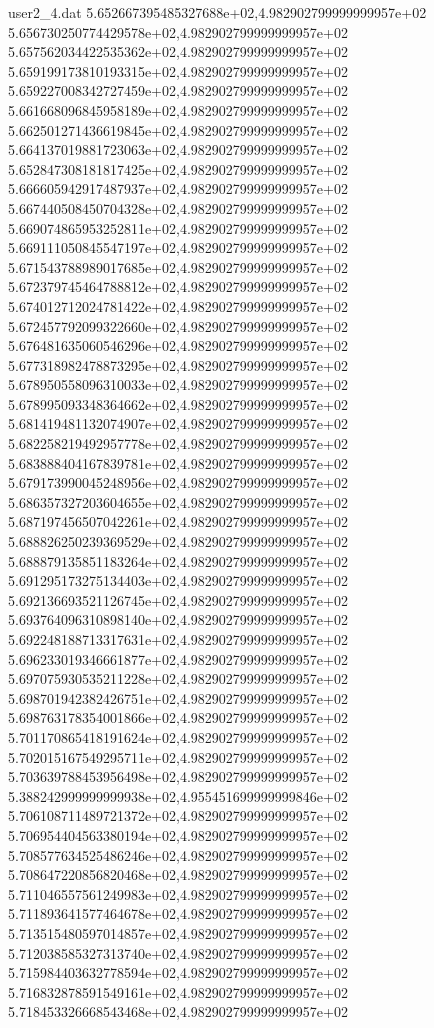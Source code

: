 \begin{filecontents}{user2_4.dat}
5.652667395485327688e+02,4.982902799999999957e+02
5.656730250774429578e+02,4.982902799999999957e+02
5.657562034422535362e+02,4.982902799999999957e+02
5.659199173810193315e+02,4.982902799999999957e+02
5.659227008342727459e+02,4.982902799999999957e+02
5.661668096845958189e+02,4.982902799999999957e+02
5.662501271436619845e+02,4.982902799999999957e+02
5.664137019881723063e+02,4.982902799999999957e+02
5.652847308181817425e+02,4.982902799999999957e+02
5.666605942917487937e+02,4.982902799999999957e+02
5.667440508450704328e+02,4.982902799999999957e+02
5.669074865953252811e+02,4.982902799999999957e+02
5.669111050845547197e+02,4.982902799999999957e+02
5.671543788989017685e+02,4.982902799999999957e+02
5.672379745464788812e+02,4.982902799999999957e+02
5.674012712024781422e+02,4.982902799999999957e+02
5.672457792099322660e+02,4.982902799999999957e+02
5.676481635060546296e+02,4.982902799999999957e+02
5.677318982478873295e+02,4.982902799999999957e+02
5.678950558096310033e+02,4.982902799999999957e+02
5.678995093348364662e+02,4.982902799999999957e+02
5.681419481132074907e+02,4.982902799999999957e+02
5.682258219492957778e+02,4.982902799999999957e+02
5.683888404167839781e+02,4.982902799999999957e+02
5.679173990045248956e+02,4.982902799999999957e+02
5.686357327203604655e+02,4.982902799999999957e+02
5.687197456507042261e+02,4.982902799999999957e+02
5.688826250239369529e+02,4.982902799999999957e+02
5.688879135851183264e+02,4.982902799999999957e+02
5.691295173275134403e+02,4.982902799999999957e+02
5.692136693521126745e+02,4.982902799999999957e+02
5.693764096310898140e+02,4.982902799999999957e+02
5.692248188713317631e+02,4.982902799999999957e+02
5.696233019346661877e+02,4.982902799999999957e+02
5.697075930535211228e+02,4.982902799999999957e+02
5.698701942382426751e+02,4.982902799999999957e+02
5.698763178354001866e+02,4.982902799999999957e+02
5.701170865418191624e+02,4.982902799999999957e+02
5.702015167549295711e+02,4.982902799999999957e+02
5.703639788453956498e+02,4.982902799999999957e+02
5.388242999999999938e+02,4.955451699999999846e+02
5.706108711489721372e+02,4.982902799999999957e+02
5.706954404563380194e+02,4.982902799999999957e+02
5.708577634525486246e+02,4.982902799999999957e+02
5.708647220856820468e+02,4.982902799999999957e+02
5.711046557561249983e+02,4.982902799999999957e+02
5.711893641577464678e+02,4.982902799999999957e+02
5.713515480597014857e+02,4.982902799999999957e+02
5.712038585327313740e+02,4.982902799999999957e+02
5.715984403632778594e+02,4.982902799999999957e+02
5.716832878591549161e+02,4.982902799999999957e+02
5.718453326668543468e+02,4.982902799999999957e+02

\end{filecontents}
